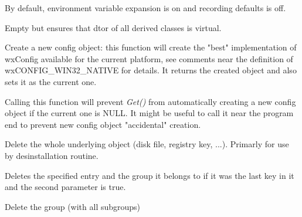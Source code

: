 
By default, environment variable expansion is on and recording defaults is
off.

\label{wxconfigbasedtor}


Empty but ensures that dtor of all derived classes is virtual.

\label{wxconfigbasecreate}


Create a new config object: this function will create the "best"
implementation of wxConfig available for the current platform, see comments
near the definition of wxCONFIG\_WIN32\_NATIVE for details. It returns the
created object and also sets it as the current one.

\label{wxconfigbasedontcreateondemand}


Calling this function will prevent {\it Get()} from automatically creating a
new config object if the current one is NULL. It might be useful to call it
near the program end to prevent new config object "accidental" creation.

\label{wxconfigbasedeleteall}


Delete the whole underlying object (disk file, registry key, ...). Primarly
for use by desinstallation routine.

\label{wxconfigbasedeleteentry}


Deletes the specified entry and the group it belongs to if it was the last key
in it and the second parameter is true.

\label{wxconfigbasedeletegroup}


Delete the group (with all subgroups)

\label{wxconfigbaseexists}

